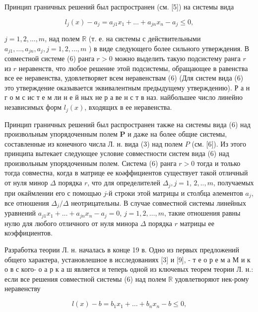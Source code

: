 \documentclass[10pt]{article}
\begin{document}
Принцип граничных решений был распространен (см. [5]) на системы вида



\[

l_{j}(x)-a_{j}=a_{j 1} x_{1}+\ldots+a_{j n} x_{n}-a_{j} \leqslant 0,

\]



$j=1,2, \ldots, m$, над полем $\mathbb{R}$ (т. е. на системы с действительными $a_{j 1}, \ldots, a_{j n}, a_{j}, j=1,2, \ldots, m$ ) в виде следующего более сильного утверждения. В совместной системе (6) ранга $r>0$ можно выделить такую подсистему ранга $r$ из $r$ неравенств, что любое решение этой подсистемы, обращающее в равенства все ее неравенства, удовлетворяет всем неравенствам (6) (Для систем вида (6) это утверждение оказывается эквивалентным предыдущему утверждению). Р а н г о м с ис т е м ли н е й ных не р а ве н с т в наз. найбольшее число линейно независимых форм $l_{j}(x)$, входящих в ее неравенства.



Принцип граничных решений был распространен также на системы вида (6) над произвольным упорядоченным полем $\boldsymbol{P}$ и даже на более общие системы, составленные из конечного числа Л. н. вида (3) над полем $P$ (см. [6]). Из этого принципа вытекает следующее условие совместности систем вида (6) над произвольным упорядоченным полем. Система (6) ранга $r>0$ тогда и только тогда совместна, когда в матрице ее коәффициентов существует такой отличный от нуля минор $\Delta$ порядка $r$, что для определителей $\Delta_{j}, j=1$, $2, . ., m$, получаемых при окаймлении его с помощью $j$-й строки этой матрицы и столбца әлементов $a_{j}$, все отношения $\Delta_{j} / \Delta$ неотрицательны. В случае совместной системы линейных уравнений $a_{j 1} x_{1}+\ldots+a_{j n} x_{n}-a_{j}=0$, $j=1,2, \ldots, m$, такие отношения равны нулю для любого отличного от нуля минора $\Delta$ порядка $r$ матрицы ее коэффициентов.



Разработка теории Л. н. началась в конце 19 в. Одно из первых предложений общего характера, установлешное в исследованиях [3] и [9], - т е о р е м а М и к о в с кого- о а р к а ш является и теперь одной из ключевых теорем теории Л. н.: если все решения совместной системы (6) над полем $\mathbb{R}$ удовлетворяют нек-рому неравенству



\[

l(x)-b=b_{1} x_{1}+\ldots+b_{n} x_{n}-b \leqslant 0,

\]
\end{document}
